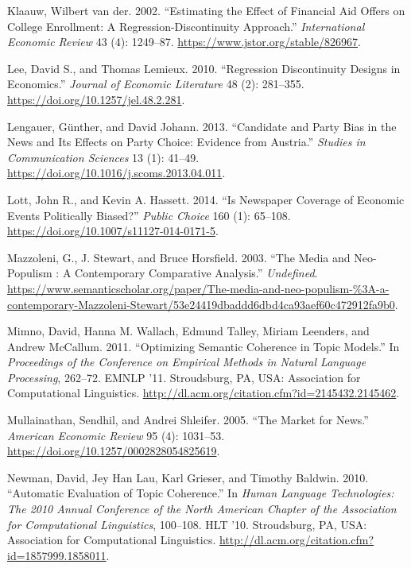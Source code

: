 \documentclass[
  12pt,
]{article}
\newlength{\cslhangindent}
\newlength{\cslentryspacingunit} %
\newenvironment{CSLReferences}[2] %
 {%
  \setlength{\parindent}{0pt}
  \ifodd #1
  \let\oldpar\par
  \def\par{\hangindent=\cslhangindent\oldpar}
  \fi
  \setlength{\parskip}{#2\cslentryspacingunit}
 }%
 {}
\begin{document}
\begin{CSLReferences}{1}{0}
\leavevmode{}%
Klaauw, Wilbert van der. 2002. {``Estimating the Effect of Financial Aid
Offers on College Enrollment: A Regression-Discontinuity Approach.''}
\emph{International Economic Review} 43 (4): 1249--87.
\url{https://www.jstor.org/stable/826967}.

\leavevmode{}%
Lee, David S., and Thomas Lemieux. 2010. {``Regression Discontinuity
Designs in Economics.''} \emph{Journal of Economic Literature} 48 (2):
281--355. \url{https://doi.org/10.1257/jel.48.2.281}.

\leavevmode{}%
Lengauer, Günther, and David Johann. 2013. {``Candidate and Party Bias
in the News and Its Effects on Party Choice: Evidence from Austria.''}
\emph{Studies in Communication Sciences} 13 (1): 41--49.
\url{https://doi.org/10.1016/j.scoms.2013.04.011}.

\leavevmode{}%
Lott, John R., and Kevin A. Hassett. 2014. {``Is Newspaper Coverage of
Economic Events Politically Biased?''} \emph{Public Choice} 160 (1):
65--108. \url{https://doi.org/10.1007/s11127-014-0171-5}.

\leavevmode{}%
Mazzoleni, G., J. Stewart, and Bruce Horsfield. 2003. {``The Media and
Neo-Populism : A Contemporary Comparative Analysis.''} \emph{Undefined}.
\url{https://www.semanticscholar.org/paper/The-media-and-neo-populism-\%3A-a-contemporary-Mazzoleni-Stewart/53e24419dbaddd6dbd4ca93aef60c472912fa9b0}.

\leavevmode{}%
Mimno, David, Hanna M. Wallach, Edmund Talley, Miriam Leenders, and
Andrew McCallum. 2011. {``Optimizing Semantic Coherence in Topic
Models.''} In \emph{Proceedings of the Conference on Empirical Methods
in Natural Language Processing}, 262--72. {EMNLP} '11. Stroudsburg,
{PA}, {USA}: Association for Computational Linguistics.
\url{http://dl.acm.org/citation.cfm?id=2145432.2145462}.

\leavevmode{}%
Mullainathan, Sendhil, and Andrei Shleifer. 2005. {``The Market for
News.''} \emph{American Economic Review} 95 (4): 1031--53.
\url{https://doi.org/10.1257/0002828054825619}.

\leavevmode{}%
Newman, David, Jey Han Lau, Karl Grieser, and Timothy Baldwin. 2010.
{``Automatic Evaluation of Topic Coherence.''} In \emph{Human Language
Technologies: The 2010 Annual Conference of the North American Chapter
of the Association for Computational Linguistics}, 100--108. {HLT} '10.
Stroudsburg, {PA}, {USA}: Association for Computational Linguistics.
\url{http://dl.acm.org/citation.cfm?id=1857999.1858011}.


\end{CSLReferences}
\end{document}
